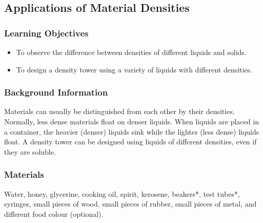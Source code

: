 %





\subsection{Applications of Material Densities}

\subsubsection*{Learning Objectives}
\begin{itemize}
\item{To observe the difference between densities of different liquids and solids.} 
\item{To design a density tower using a variety of liquids with different densities.} 
\end{itemize}

\subsubsection*{Background Information}
Materials can usually be distinguished from each other by their densities.  Normally, less dense materials float on denser liquids.  When liquids are placed in a container, the heavier (denser) liquids sink while the lighter (less dense) liquids float.  A density tower can be designed using liquids of different densities, even if they are soluble.

\subsubsection*{Materials}
Water, honey, glycerine, cooking oil, spirit, kerosene, beakers*, test tubes*, syringes, small pieces of wood, small pieces of rubber, small pieces of metal, and different food colour (optional).

